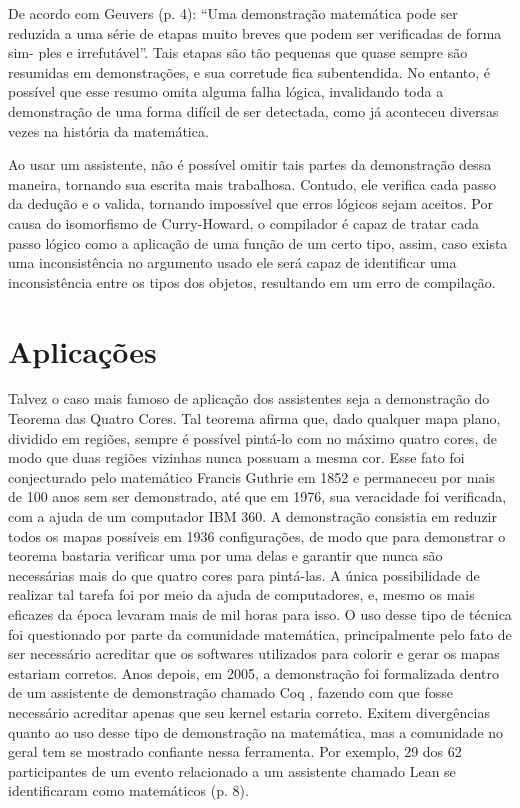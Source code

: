 \documentclass[12pt, oneside, a4paper,english,brazil]{abntex2}
\begin{document}
\qquad De acordo com Geuvers \cite{geuvers} (p. 4): ``Uma demonstração matemática pode ser
reduzida a uma série de etapas muito breves que podem ser verificadas de forma sim-
ples e irrefutável''. Tais etapas são tão pequenas que quase sempre são resumidas em
demonstrações, e sua corretude fica subentendida. No entanto, é possível que esse resumo
omita alguma falha lógica, invalidando toda a demonstração de uma forma difícil de ser
detectada, como j\'a aconteceu diversas vezes na hist\'oria da matem\'atica.

\qquad Ao usar um assistente, não é possível omitir tais partes da demonstração dessa
maneira, tornando sua escrita mais trabalhosa. Contudo, ele verifica cada passo da dedução
e o valida, tornando impossível que erros lógicos sejam aceitos. Por causa do isomorfismo
de Curry-Howard, o compilador é capaz de tratar cada passo lógico como a aplicação de
uma função de um certo tipo, assim, caso exista uma inconsistência no argumento usado
ele será capaz de identificar uma inconsistência entre os tipos dos objetos, resultando em
um erro de compilação.

\section{Aplica\c{c}\~oes}

\qquad Talvez o caso mais famoso de aplicação dos assistentes seja a demonstração do
Teorema das Quatro Cores. Tal teorema afirma que, dado qualquer mapa plano, dividido
em regiões, sempre é possível pintá-lo com no máximo quatro cores, de modo que duas
regiões vizinhas nunca possuam a mesma cor. Esse fato foi conjecturado pelo matemático
Francis Guthrie em 1852 e permaneceu por mais de 100 anos sem ser demonstrado, até
que em 1976, sua veracidade foi verificada, com a ajuda de um computador IBM 360. A
demonstração consistia em reduzir todos os mapas possíveis em 1936 configurações, de
modo que para demonstrar o teorema bastaria verificar uma por uma delas e garantir que
nunca são necessárias mais do que quatro cores para pintá-las. A única possibilidade de
realizar tal tarefa foi por meio da ajuda de computadores, e, mesmo os mais eficazes da
época levaram mais de mil horas para isso. O uso desse tipo de técnica foi questionado por
parte da comunidade matemática, principalmente pelo fato de ser necessário acreditar que
os softwares utilizados para colorir e gerar os mapas estariam corretos. Anos depois, em
2005, a demonstração foi formalizada dentro de um assistente de demonstra\c{c}\~ao chamado Coq \cite{fourcolor}, fazendo com
que fosse necessário acreditar apenas que seu kernel estaria correto. Exitem divergências
quanto ao uso desse tipo de demonstração na matemática, mas a comunidade no geral
tem se mostrado confiante nessa ferramenta. Por exemplo, 29 dos 62 participantes de um evento
relacionado a um assistente chamado Lean \cite{2} se identificaram como matemáticos \cite{hitchhiker} (p. 8).
\end{document}
